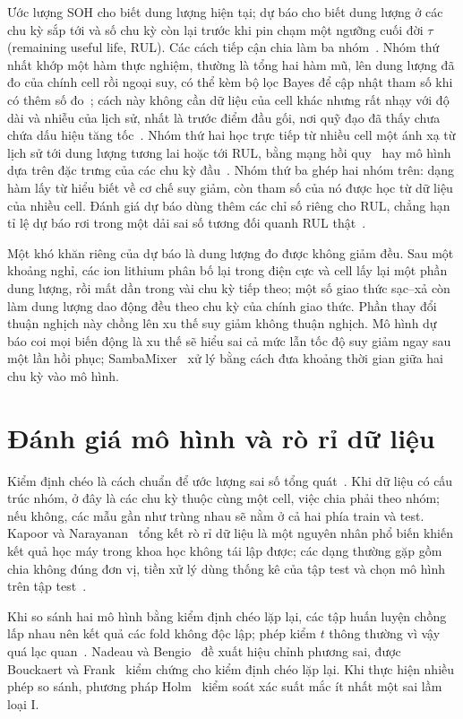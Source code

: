 \documentclass[12pt,a4paper,oneside]{report}
\theoremstyle{plain}
\theoremstyle{definition}
\begin{document}
Ước lượng SOH cho biết dung lượng hiện tại; dự báo cho biết dung lượng ở các chu kỳ sắp tới và số chu kỳ còn lại
trước khi pin chạm một ngưỡng cuối đời $\tau$ (remaining useful life, RUL). Các cách tiếp cận chia làm ba
nhóm~\cite{hu2020joule}. Nhóm thứ nhất khớp một hàm thực nghiệm, thường là tổng hai hàm mũ, lên dung lượng đã đo của
chính cell rồi ngoại suy, có thể kèm bộ lọc Bayes để cập nhật tham số khi có thêm số đo~\cite{he2011}; cách này không
cần dữ liệu của cell khác nhưng rất nhạy với độ dài và nhiễu của lịch sử, nhất là trước điểm đầu gối, nơi quỹ đạo đã
thấy chưa chứa dấu hiệu tăng tốc~\cite{attia2022knee}. Nhóm thứ hai học trực tiếp từ nhiều cell một ánh xạ từ lịch sử
tới dung lượng tương lai hoặc tới RUL, bằng mạng hồi quy~\cite{zhang2018lstm} hay mô hình dựa trên đặc trưng của các chu
kỳ đầu~\cite{severson2019}. Nhóm thứ ba ghép hai nhóm trên: dạng hàm lấy từ hiểu biết về cơ chế suy giảm, còn tham số
của nó được học từ dữ liệu của nhiều cell. Đánh giá dự báo dùng thêm các chỉ số riêng cho RUL, chẳng hạn tỉ lệ dự báo
rơi trong một dải sai số tương đối quanh RUL thật~\cite{saxena2008}.

Một khó khăn riêng của dự báo là dung lượng đo được không giảm đều. Sau một khoảng nghỉ, các ion lithium phân bố lại
trong điện cực và cell lấy lại một phần dung lượng, rồi mất dần trong vài chu kỳ tiếp theo; một số giao thức sạc--xả
còn làm dung lượng dao động đều theo chu kỳ của chính giao thức. Phần thay đổi thuận nghịch này chồng lên xu thế suy
giảm không thuận nghịch. Mô hình dự báo coi mọi biến động là xu thế sẽ hiểu sai cả mức lẫn tốc độ suy giảm ngay sau
một lần hồi phục; SambaMixer~\cite{olalde2024samba} xử lý bằng cách đưa khoảng thời gian giữa hai chu kỳ vào mô hình.
\section{Đánh giá mô hình và rò rỉ dữ liệu}

Kiểm định chéo là cách chuẩn để ước lượng sai số tổng quát~\cite{arlot2010}. Khi dữ liệu có cấu trúc nhóm, ở
đây là các chu kỳ thuộc cùng một cell, việc chia phải theo nhóm; nếu không, các mẫu gần như trùng nhau sẽ nằm
ở cả hai phía train và test. Kapoor và Narayanan~\cite{kapoor2023} tổng kết rò rỉ dữ liệu là một nguyên nhân
phổ biến khiến kết quả học máy trong khoa học không tái lập được; các dạng thường gặp gồm chia không đúng đơn
vị, tiền xử lý dùng thống kê của tập test và chọn mô hình trên tập test~\cite{varma2006}.

Khi so sánh hai mô hình bằng kiểm định chéo lặp lại, các tập huấn luyện chồng lấp nhau nên kết quả các fold
không độc lập; phép kiểm $t$ thông thường vì vậy quá lạc quan~\cite{dietterich1998}. Nadeau và
Bengio~\cite{nadeau2003} đề xuất hiệu chỉnh phương sai, được Bouckaert và Frank~\cite{bouckaert2004} kiểm
chứng cho kiểm định chéo lặp lại. Khi thực hiện nhiều phép so sánh, phương pháp Holm~\cite{holm1979} kiểm
soát xác suất mắc ít nhất một sai lầm loại I.
\end{document}
